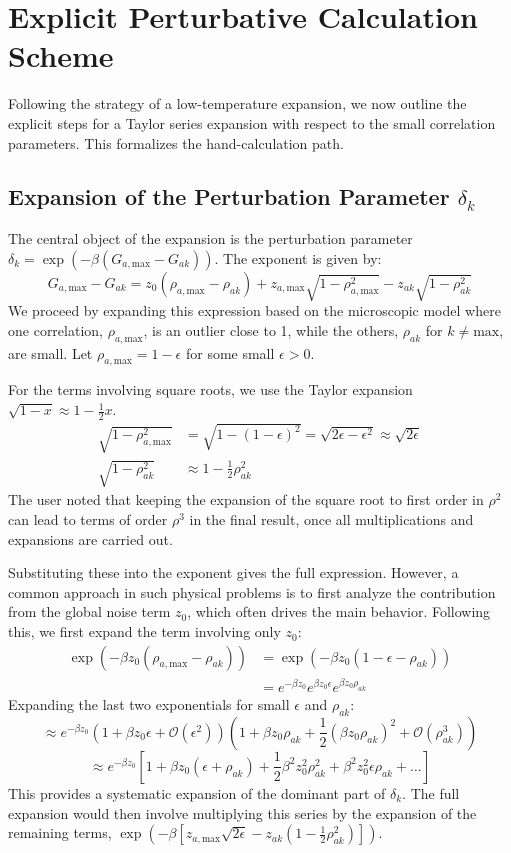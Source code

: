 \documentclass[12pt]{article}
\begin{document}
\section{Explicit Perturbative Calculation Scheme}

Following the strategy of a low-temperature expansion, we now outline the explicit steps for a Taylor series expansion with respect to the small correlation parameters. This formalizes the hand-calculation path.

\subsection{Expansion of the Perturbation Parameter \(\delta_k\)}
The central object of the expansion is the perturbation parameter $\delta_k = \exp(-\beta(G_{a, \text{max}} - G_{ak}))$. The exponent is given by:
\[
G_{a, \text{max}} - G_{ak} = z_0(\rho_{a, \text{max}} - \rho_{ak}) + z_{a,\text{max}}\sqrt{1-\rho_{a, \text{max}}^2} - z_{ak}\sqrt{1-\rho_{ak}^2}
\]
We proceed by expanding this expression based on the microscopic model where one correlation, $\rho_{a, \text{max}}$, is an outlier close to 1, while the others, $\rho_{ak}$ for $k \neq \text{max}$, are small. Let $\rho_{a, \text{max}} = 1 - \epsilon$ for some small $\epsilon > 0$.

For the terms involving square roots, we use the Taylor expansion $\sqrt{1-x} \approx 1 - \frac{1}{2}x$.
\begin{align*}
\sqrt{1-\rho_{a, \text{max}}^2} &= \sqrt{1 - (1-\epsilon)^2} = \sqrt{2\epsilon - \epsilon^2} \approx \sqrt{2\epsilon} \\
\sqrt{1-\rho_{ak}^2} &\approx 1 - \frac{1}{2}\rho_{ak}^2
\end{align*}
The user noted that keeping the expansion of the square root to first order in $\rho^2$ can lead to terms of order $\rho^3$ in the final result, once all multiplications and expansions are carried out.

Substituting these into the exponent gives the full expression. However, a common approach in such physical problems is to first analyze the contribution from the global noise term $z_0$, which often drives the main behavior. Following this, we first expand the term involving only $z_0$:
\begin{align*}
\exp(-\beta z_0(\rho_{a, \text{max}} - \rho_{ak})) &= \exp(-\beta z_0(1 - \epsilon - \rho_{ak})) \\
&= e^{-\beta z_0} e^{\beta z_0 \epsilon} e^{\beta z_0 \rho_{ak}}
\end{align*}
Expanding the last two exponentials for small $\epsilon$ and $\rho_{ak}$:
\[
\approx e^{-\beta z_0} (1 + \beta z_0 \epsilon + \mathcal{O}(\epsilon^2)) (1 + \beta z_0 \rho_{ak} + \frac{1}{2}(\beta z_0 \rho_{ak})^2 + \mathcal{O}(\rho_{ak}^3))
\]
\[
\approx e^{-\beta z_0} \left[1 + \beta z_0(\epsilon + \rho_{ak}) + \frac{1}{2}\beta^2 z_0^2 \rho_{ak}^2 + \beta^2 z_0^2 \epsilon \rho_{ak} + \dots \right]
\]
This provides a systematic expansion of the dominant part of $\delta_k$. The full expansion would then involve multiplying this series by the expansion of the remaining terms, $\exp(-\beta[z_{a,\text{max}}\sqrt{2\epsilon} - z_{ak}(1 - \frac{1}{2}\rho_{ak}^2)])$.
\end{document}
